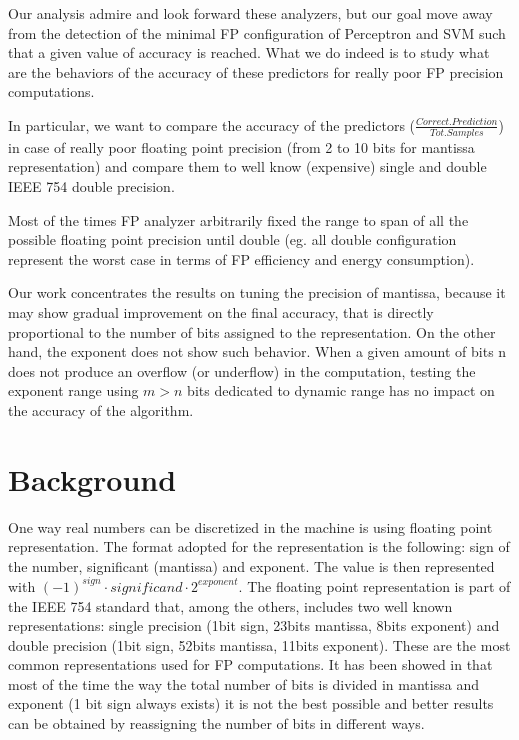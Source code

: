 \documentclass[sigplan,review,anonymous=false]{acmart}\settopmatter{printfolios=true,printccs=false,printacmref=false}
\begin{document}

Our analysis admire and look forward these analyzers, but our goal move away from the detection of the minimal FP configuration of Perceptron and SVM such that a given value of accuracy is reached. What we do indeed is to study what are the behaviors of the accuracy of these predictors for really poor FP precision computations. 

In particular, we want to compare the accuracy of the predictors ($\frac{Correct.Prediction}{Tot.Samples}$) in case of really poor floating point precision (from 2 to 10 bits for mantissa representation) and compare them to well know (expensive) single and double IEEE 754 double precision. 

Most of the times FP analyzer arbitrarily fixed the range to span of all the possible floating point precision until double (eg. all double configuration represent the worst case in terms of FP efficiency and energy consumption). 

Our work concentrates the results on tuning the precision of mantissa, because it may show gradual improvement on the final accuracy, that is directly proportional to the number of bits assigned to the representation. 
On the other hand, the exponent does not show such behavior. When a given amount of bits n does not produce an overflow (or underflow) in the computation, testing the exponent range using $m>n$ bits dedicated to dynamic range has no impact on the accuracy of the algorithm. 

\section{Background}
One way real numbers can be discretized in the machine is using floating point representation. The format adopted for the representation is the following: sign of the number, significant (mantissa) and exponent. The  value is then represented with $(-1)^{sign} \cdot significand \cdot 2^{exponent}$. 
The floating point representation is part of the IEEE 754 standard that, among the others, includes two well known representations: single precision (1bit sign, 23bits mantissa, 8bits exponent) and double precision (1bit sign, 52bits mantissa, 11bits exponent). 
These are the most common representations used for FP computations. It has been showed in \cite{softfloat} that most of the time the way the total number of bits is divided in mantissa and exponent (1 bit sign always exists) it is not the best possible and better results can be obtained by reassigning the number of bits in different ways\cite{softfloat}.
\end{document}
